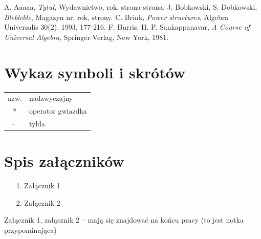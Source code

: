 \documentclass[en]{minipw} %
\begin{document}

\begin{thebibliography}{20}%

 A. Aaaaa, \emph{Tytuł}, Wydawnictwo, rok, strona-strona.
 J. Bobkowski, S. Dobkowski, \emph{Blebleble}, Magazyn nr, rok, strony.
 C. Brink, \emph{Power structures}, Algebra Universalis 30(2), 1993, 177-216.
 F. Burris, H. P. Sankappanavar, \emph{A Course of Universal Algebra}, Springer-Verlag, New York, 1981.

\end{thebibliography}



\chapter*{Wykaz symboli i skrótów}

\begin{tabular}{cl}
nzw. & nadzwyczajny \\
* & operator gwiazdka \\
$\widetilde{}$ & tylda
\end{tabular}


\listoffigures


\renewcommand{\listtablename}{Spis tabel}
\listoftables


\chapter*{Spis załączników}
\begin{enumerate}
\item[1.] Załącznik 1
\item[2.] Załącznik 2
\end{enumerate}

\newpage
\pagestyle{empty}
Załącznik 1, załącznik 2 -- mają się znajdować na końcu pracy (to jest notka przypominająca)
\end{document}
